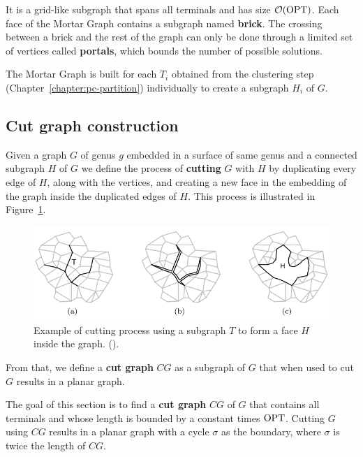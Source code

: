 It is a grid-like subgraph that spans all terminals and has size \(\mathcal{O}(\operatorname{\textrm{OPT}})\). Each face of the Mortar Graph contains a subgraph named \textbf{brick}. The crossing between a brick and the rest of the graph can only be done through a limited set of vertices called \textbf{portals}, which bounds the number of possible solutions.

The Mortar Graph is built for each \(T_i\) obtained from the clustering step (Chapter~\ref{chapter:pc-partition}) individually to create a subgraph \(H_i\) of \(G\).

\subsection{Cut graph construction}

Given a graph \(G\) of genus \(g\) embedded in a surface of same genus and a connected subgraph \(H\) of \(G\) we define the process of \textbf{cutting} \(G\) with \(H\) by duplicating every edge of \(H\), along with the vertices, and creating a new face in the embedding of the graph inside the duplicated edges of \(H\). This process is illustrated in Figure~\ref{fig:cut_graph_example}.

\begin{figure}[h]
    \centering
    \includegraphics[scale=0.7]{imgs/cut_graph_example.png}
    \caption {Example of cutting process using a subgraph \(T\) to form a face \(H\) inside the graph. (\cite{Borradaile2012}).}
    \label{fig:cut_graph_example}
\end{figure}


From that, we define a \textbf{cut graph} \(CG\) as a subgraph of \(G\) that when used to cut \(G\) results in a planar graph.

The goal of this section is to find a \textbf{cut graph} \(CG\) of \(G\) that contains all terminals and whose length is bounded by a constant times \(\operatorname{\textrm{OPT}}\). Cutting \(G\) using \(CG\) results in a planar graph with a cycle \(\sigma\) as the boundary, where \(\sigma\) is twice the length of \(CG\).

